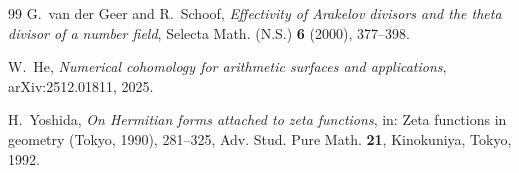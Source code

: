 \documentclass[11pt]{amsart}
\theoremstyle{definition}
\theoremstyle{remark}
\begin{document}
\begin{thebibliography}{99}
G.~van der Geer and R.~Schoof, \emph{Effectivity of Arakelov divisors and the
theta divisor of a number field}, Selecta Math. (N.S.) \textbf{6} (2000),
377--398.

W.~He, \emph{Numerical cohomology for arithmetic surfaces and applications},
arXiv:2512.01811, 2025.

H.~Yoshida, \emph{On Hermitian forms attached to zeta functions}, in: Zeta
functions in geometry (Tokyo, 1990), 281--325, Adv. Stud. Pure Math.
\textbf{21}, Kinokuniya, Tokyo, 1992.

\end{thebibliography}
\end{document}
